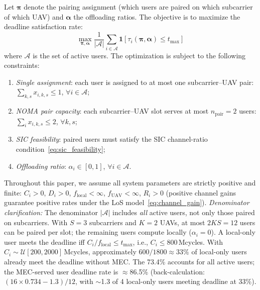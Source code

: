 \documentclass[journal]{IEEEtran}
\begin{document}
Let $\boldsymbol{\pi}$ denote the pairing assignment (which users are paired on which subcarrier of which UAV) and $\boldsymbol{\alpha}$ the offloading ratios.
The objective is to maximize the deadline satisfaction rate:
\begin{equation}
    \max_{\boldsymbol{\pi}, \boldsymbol{\alpha}} \frac{1}{|\mathcal{A}|} \sum_{i \in \mathcal{A}} \mathbf{1}[\tau_i(\boldsymbol{\pi}, \boldsymbol{\alpha}) \leq t_{\max}]
    \label{eq:objective}
\end{equation}
where $\mathcal{A}$ is the set of active users.
The optimization is subject to the following constraints:
\begin{enumerate}[label=(\roman*),leftmargin=*,nosep]
    \item \emph{Single assignment}: each user is assigned to at most one subcarrier--UAV pair: $\sum_{k,s} x_{i,k,s} \leq 1$, $\forall i \in \mathcal{A}$;
    \item \emph{NOMA pair capacity}: each subcarrier--UAV slot serves at most $n_{\text{pair}}\!=\!2$ users: $\sum_{i} x_{i,k,s} \leq 2$, $\forall k, s$;
    \item \emph{SIC feasibility}: paired users must satisfy the SIC channel-ratio condition~\eqref{eq:sic_feasibility};
    \item \emph{Offloading ratio}: $\alpha_i \in [0,1]$, $\forall i \in \mathcal{A}$.
\end{enumerate}
Throughout this paper, we assume all system parameters are strictly positive and finite: $C_i > 0$, $D_i > 0$, $f_{\text{local}} < \infty$, $f_{\text{UAV}} < \infty$, $R_i > 0$ (positive channel gains guarantee positive rates under the LoS model~\eqref{eq:channel_gain}).
\emph{Denominator clarification:}
The denominator $|\mathcal{A}|$ includes \emph{all} active users, not only those paired on subcarriers.
With $S = 3$ subcarriers and $K = 2$ UAVs, at most $2KS = 12$ users can be paired per slot; the remaining users compute locally ($\alpha_i = 0$).
A local-only user meets the deadline iff $C_i / f_{\text{local}} \leq t_{\max}$, i.e., $C_i \leq 800$\,Mcycles.
With $C_i \sim \mathcal{U}[200, 2000]$\,Mcycles, approximately $600/1800 \approx 33\%$ of local-only users already meet the deadline without MEC.
The 73.4\% accounts for all active users; the MEC-served user deadline rate is $\approx$86.5\% (back-calculation: $(16\times0.734 - 1.3)/12$, with $\sim$1.3 of 4 local-only users meeting deadline at 33\%).
\end{document}
